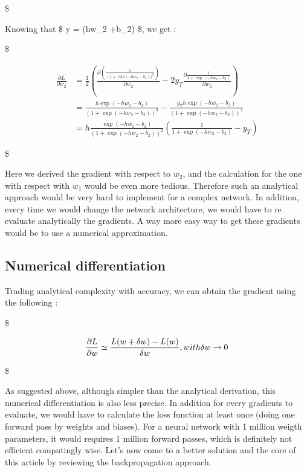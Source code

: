 \documentclass[11pt]{article}
\begin{document}
\$

Knowing that \$ y = \sigma (hw\_2 +b\_2) \$, we get :

\$

\begin{equation} 
    \begin{split}
        \frac{\partial L}{\partial w_2} & = \frac{1}{2} \left(\frac{\partial \left(\frac{1}{\left( 1 + \exp(-hw_2 -b_2\right))^2}\right)}{\partial w_2} - 2y_T \frac{\partial \frac{1}{1 + \exp(-hw_2 - b_2)}}{\partial w_2}\right) \\
                                        & = \frac{h \exp(-hw_2 - b_2)}{\left(1+\exp(-hw_2 - b_2)\right)^3} - \frac{y_T h \exp(-hw_2 - b_2)}{\left(1+\exp(-hw_2 - b_2)\right)^2} \\
                                        & = h\frac{ \exp(-hw_2 - b_2)}{\left(1+\exp(-hw_2 - b_2)\right)^2} \left(\frac{1}{1+\exp(-hw_2 - b_2)} - y_T\right)
    \end{split}
\end{equation}

\$

Here we derived the gradient with respect to \(w_2\), and the
calculation for the one with respect with \(w_1\) would be even more
tedious. Therefore such an analytical approach would be very hard to
implement for a complex network. In addition, every time we would change
the network architecture, we would have to re evaluate analytically the
gradients. A way more easy way to get these gradients would be to use a
numerical approximation.

\subsection{Numerical differentiation}\label{numerical-differentiation}

Trading analytical complexity with accuracy, we can obtain the gradient
using the following :

\$

\begin{equation} 
    \begin{split}
        \frac{\partial L}{\partial w} \simeq \frac{L(w + \delta w) - L(w)}{\delta w}, \space with \space\delta w \rightarrow 0
    \end{split}
\end{equation}

\$

As suggested above, although simpler than the analytical derivation,
this numerical differentiation is also less precise. In addition for
every gradients to evaluate, we would have to calculate the loss
function at least once (doing one forward pass by weights and biases).
For a neural network with 1 million weigth parameters, it would requires
1 million forward passes, which is definitely not efficient computingly
wise. Let's now come to a better solution and the core of this article
by reviewing the backpropagation approach.
\end{document}
